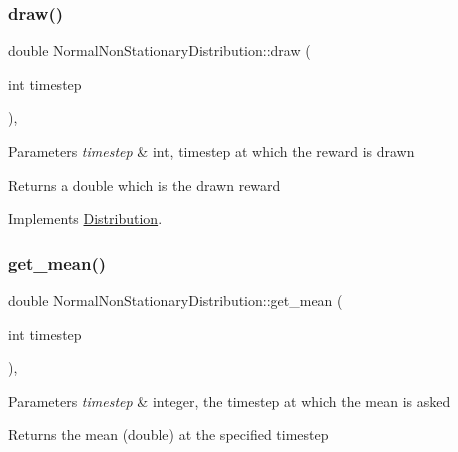 \subsubsection{\texorpdfstring{draw()}{draw()}}
{\footnotesize\ttfamily double Normal\+Non\+Stationary\+Distribution\+::draw (\begin{DoxyParamCaption}\item[{int}]{timestep }\end{DoxyParamCaption})\hspace{0.3cm}{\ttfamily [override]}, {\ttfamily [virtual]}}


\begin{DoxyParams}{Parameters}
{\em timestep} & int, timestep at which the reward is drawn \\
\hline
\end{DoxyParams}
\begin{DoxyReturn}{Returns}
a double which is the drawn reward 
\end{DoxyReturn}


Implements \mbox{\hyperlink{class_distribution_a742b398af4a461243028cce3c47d8080}{Distribution}}.

\mbox{\label{class_normal_non_stationary_distribution_ae3d2f4fb0e5c9b706c84d05ac14de2aa}} 
\subsubsection{\texorpdfstring{get\+\_\+mean()}{get\_mean()}}
{\footnotesize\ttfamily double Normal\+Non\+Stationary\+Distribution\+::get\+\_\+mean (\begin{DoxyParamCaption}\item[{int}]{timestep }\end{DoxyParamCaption})\hspace{0.3cm}{\ttfamily [override]}, {\ttfamily [virtual]}}


\begin{DoxyParams}{Parameters}
{\em timestep} & integer, the timestep at which the mean is asked \\
\hline
\end{DoxyParams}
\begin{DoxyReturn}{Returns}
the mean (double) at the specified timestep 
\end{DoxyReturn}


